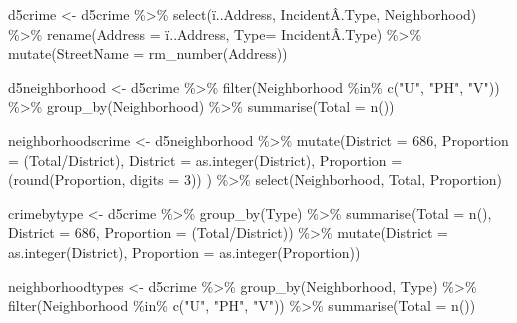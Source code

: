 \documentclass[
]{article}
\newenvironment{Shaded}{\begin{snugshade}}{\end{snugshade}}
\newcommand{\AttributeTok}[1]{\textcolor[rgb]{0.77,0.63,0.00}{#1}}
\newcommand{\DecValTok}[1]{\textcolor[rgb]{0.00,0.00,0.81}{#1}}
\newcommand{\FunctionTok}[1]{\textcolor[rgb]{0.00,0.00,0.00}{#1}}
\newcommand{\NormalTok}[1]{#1}
\newcommand{\OtherTok}[1]{\textcolor[rgb]{0.56,0.35,0.01}{#1}}
\newcommand{\SpecialCharTok}[1]{\textcolor[rgb]{0.00,0.00,0.00}{#1}}
\newcommand{\StringTok}[1]{\textcolor[rgb]{0.31,0.60,0.02}{#1}}
\begin{document}
\begin{Shaded}
\begin{Highlighting}[]
\NormalTok{d5crime }\OtherTok{\textless{}{-}}\NormalTok{ d5crime }\SpecialCharTok{\%\textgreater{}\%} 
  \FunctionTok{select}\NormalTok{(ï..Address, IncidentÂ.Type, Neighborhood) }\SpecialCharTok{\%\textgreater{}\%}
  \FunctionTok{rename}\NormalTok{(}\AttributeTok{Address =}\NormalTok{ ï..Address, }\AttributeTok{Type=}\NormalTok{ IncidentÂ.Type) }\SpecialCharTok{\%\textgreater{}\%} 
  \FunctionTok{mutate}\NormalTok{(}\AttributeTok{StreetName =} \FunctionTok{rm\_number}\NormalTok{(Address))}
   
\NormalTok{d5neighborhood }\OtherTok{\textless{}{-}}\NormalTok{ d5crime }\SpecialCharTok{\%\textgreater{}\%}
  \FunctionTok{filter}\NormalTok{(Neighborhood }\SpecialCharTok{\%in\%} \FunctionTok{c}\NormalTok{(}\StringTok{"U"}\NormalTok{, }\StringTok{"PH"}\NormalTok{, }\StringTok{"V"}\NormalTok{)) }\SpecialCharTok{\%\textgreater{}\%}
  \FunctionTok{group\_by}\NormalTok{(Neighborhood) }\SpecialCharTok{\%\textgreater{}\%}
  \FunctionTok{summarise}\NormalTok{(}\AttributeTok{Total =} \FunctionTok{n}\NormalTok{())}

\NormalTok{neighborhoodscrime }\OtherTok{\textless{}{-}}\NormalTok{ d5neighborhood }\SpecialCharTok{\%\textgreater{}\%}
  \FunctionTok{mutate}\NormalTok{(}\AttributeTok{District =} \DecValTok{686}\NormalTok{,}
         \AttributeTok{Proportion =}\NormalTok{ (Total}\SpecialCharTok{/}\NormalTok{District),}
         \AttributeTok{District =} \FunctionTok{as.integer}\NormalTok{(District),}
        \AttributeTok{Proportion =}\NormalTok{ (}\FunctionTok{round}\NormalTok{(Proportion, }\AttributeTok{digits =} \DecValTok{3}\NormalTok{)) ) }\SpecialCharTok{\%\textgreater{}\%}
  \FunctionTok{select}\NormalTok{(Neighborhood, Total, Proportion)  }
  
    
\NormalTok{crimebytype }\OtherTok{\textless{}{-}}\NormalTok{ d5crime }\SpecialCharTok{\%\textgreater{}\%}
  \FunctionTok{group\_by}\NormalTok{(Type) }\SpecialCharTok{\%\textgreater{}\%}
  \FunctionTok{summarise}\NormalTok{(}\AttributeTok{Total =} \FunctionTok{n}\NormalTok{(),}
            \AttributeTok{District =} \DecValTok{686}\NormalTok{,}
            \AttributeTok{Proportion =}\NormalTok{ (Total}\SpecialCharTok{/}\NormalTok{District)) }\SpecialCharTok{\%\textgreater{}\%}
   \FunctionTok{mutate}\NormalTok{(}\AttributeTok{District =} \FunctionTok{as.integer}\NormalTok{(District),}
          \AttributeTok{Proportion =} \FunctionTok{as.integer}\NormalTok{(Proportion))}

\NormalTok{neighborhoodtypes }\OtherTok{\textless{}{-}}\NormalTok{ d5crime }\SpecialCharTok{\%\textgreater{}\%}
  \FunctionTok{group\_by}\NormalTok{(Neighborhood, Type) }\SpecialCharTok{\%\textgreater{}\%}
  \FunctionTok{filter}\NormalTok{(Neighborhood }\SpecialCharTok{\%in\%} \FunctionTok{c}\NormalTok{(}\StringTok{"U"}\NormalTok{, }\StringTok{"PH"}\NormalTok{, }\StringTok{"V"}\NormalTok{)) }\SpecialCharTok{\%\textgreater{}\%}
  \FunctionTok{summarise}\NormalTok{(}\AttributeTok{Total =} \FunctionTok{n}\NormalTok{())}
\end{Highlighting}
\end{Shaded}
\end{document}
